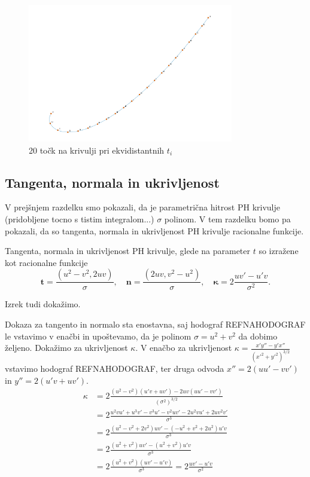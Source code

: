 \documentclass[isrm2, tisk]{fmfdelo}
\begin{document}
    \begin{figure}[h]
        \centering
        \includegraphics[width = 0.80\textwidth]{images/enakomerni-s}
        \caption{20 točk na krivulji pri ekvidistantnih $t_i$}
        \label{fig:enakomerni-s}
    \end{figure}

    \subsection{Tangenta, normala in ukrivljenost}
    V prejšnjem razdelku smo pokazali, da je parametrična hitrost PH krivulje (pridobljene tocno s tistim integralom...) $\sigma$ polinom.
    V tem razdelku bomo pa pokazali, da so tangenta, normala in ukrivljenost PH krivulje racionalne funkcije.

    \begin{izrek}
        Tangenta, normala in ukrivljenost PH krivulje, glede na parameter $t$ so izražene kot racionalne funkcije
        \[\mathbf{t}=\frac{(u^2-v^2,2uv)}{\sigma}, \quad \mathbf{n}=\frac{(2uv,v^2-u^2)}{\sigma},\quad \mathbf{\kappa}=2\frac{uv'-u'v}{\sigma^2}.\]
    \end{izrek}
    Izrek tudi dokažimo.
    \begin{dokaz}
        Dokaza za tangento in normalo sta enostavna, saj hodograf REFNAHODOGRAF le vstavimo v enačbi in upoštevamo, da je polinom $\sigma = u^2+v^2$ da dobimo željeno.
        Dokažimo za ukrivljenost $\kappa$.
        V enačbo za ukrivljenost  $\kappa = \frac{x'y''-y'x''}{(x'^2+y'^2)^{3/2}}$ vstavimo hodograf REFNAHODOGRAF, ter druga odvoda $x'' = 2(uu'-vv')$ in $y'' = 2(u'v+uv')$.
        \begin{align*}
            \kappa &= 2\frac{(u^2-v^2)(u'v+uv') - 2uv(uu'-vv')}{(\sigma^2)^{3/2}}\\
            &= 2\frac{u^2vu' + u^3v' - v^3u' - v^2uv' - 2u^2vu'+2uv^2v'}{\sigma^{3}} \\
            &= 2\frac{(u^2-v^2+2v^2)uv' - (-u^2+v^2+2u^2)u'v}{\sigma^{3}} \\
            &= 2\frac{(u^2+v^2)uv' - (u^2+v^2)u'v}{\sigma^{3}} \\
            &= 2\frac{(u^2+v^2)(uv' - u'v)}{\sigma^{3}} = 2\frac{uv' - u'v}{\sigma^{2}}
        \end{align*}
    \end{dokaz}
\end{document}

